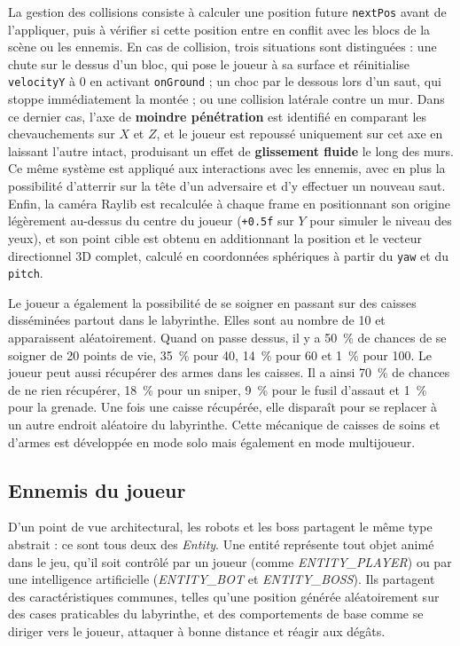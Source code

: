 \documentclass[a4paper,11pt]{article}
\begin{document}
La gestion des collisions consiste à calculer une position future \texttt{nextPos} avant de l'appliquer, puis à vérifier si cette position entre en conflit avec les blocs de la scène ou les ennemis. En cas de collision, trois situations sont distinguées : une chute sur le dessus d'un bloc, qui pose le joueur à sa surface et réinitialise \texttt{velocityY} à $0$ en activant \texttt{onGround} ; un choc par le dessous lors d'un saut, qui stoppe immédiatement la montée ; ou une collision latérale contre un mur. Dans ce dernier cas, l'axe de \textbf{moindre pénétration} est identifié en comparant les chevauchements sur $X$ et $Z$, et le joueur est repoussé uniquement sur cet axe en laissant l'autre intact, produisant un effet de \textbf{glissement fluide} le long des murs. Ce même système est appliqué aux interactions avec les ennemis, avec en plus la possibilité d'atterrir sur la tête d'un adversaire et d'y effectuer un nouveau saut. Enfin, la caméra Raylib est recalculée à chaque frame en positionnant son origine légèrement au-dessus du centre du joueur (\texttt{+0.5f} sur $Y$ pour simuler le niveau des yeux), et son point cible est obtenu en additionnant la position et le vecteur directionnel 3D complet, calculé en coordonnées sphériques à partir du \texttt{yaw} et du \texttt{pitch}.

Le joueur a également la possibilité de se soigner en passant sur des caisses disséminées partout dans le labyrinthe. Elles sont au nombre de 10 et apparaissent aléatoirement. Quand on passe dessus, il y a 50~\% de chances de se soigner de 20 points de vie, 35~\% pour 40, 14~\% pour 60 et 1~\% pour 100. Le joueur peut aussi récupérer des armes dans les caisses. Il a ainsi 70~\% de chances de ne rien récupérer, 18~\% pour un sniper, 9~\% pour le fusil d'assaut et 1~\% pour la grenade. Une fois une caisse récupérée, elle disparaît pour se replacer à un autre endroit aléatoire du labyrinthe. Cette mécanique de caisses de soins et d'armes est développée en mode solo mais également en mode multijoueur.




\subsection{Ennemis du joueur}\label{Ennemis}
\hspace*{1.5em}
D'un point de vue architectural, les robots et les boss partagent le même type abstrait : ce sont tous deux des \emph{Entity}. Une entité représente tout objet 
animé dans le jeu, qu'il soit contrôlé par un joueur (comme \emph{ENTITY\_PLAYER}) ou par une intelligence artificielle (\emph{ENTITY\_BOT} et 
\emph{ENTITY\_BOSS}). Ils partagent des caractéristiques communes, telles qu'une position générée aléatoirement sur des cases praticables du labyrinthe, et des 
comportements de base comme se diriger vers le joueur, attaquer à bonne distance et réagir aux dégâts.
\end{document}
